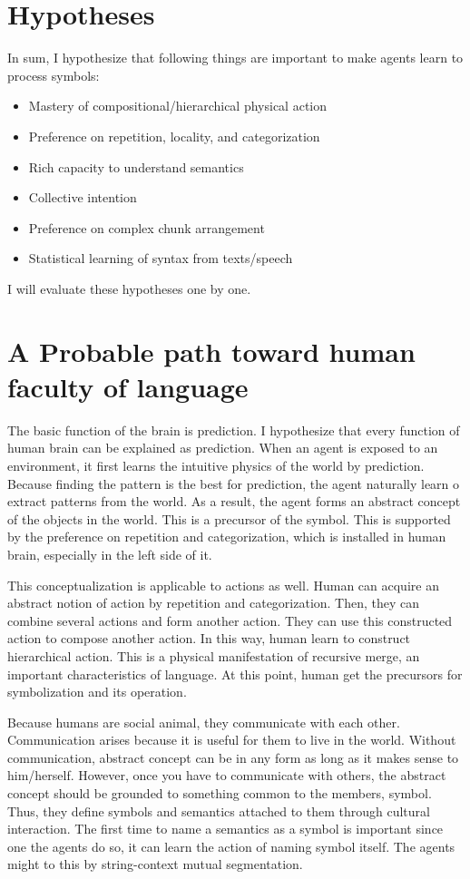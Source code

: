 \documentclass[12pt]{article}
\begin{document}
\section{Hypotheses}
In sum, I hypothesize that following things are important to make agents 
learn to process symbols:
\begin{itemize}
    \item Mastery of compositional/hierarchical physical action
    \item Preference on repetition, locality, and categorization
    \item Rich capacity to understand semantics
    \item Collective intention
    \item Preference on complex chunk arrangement
    \item Statistical learning of syntax from texts/speech
\end{itemize}
I will evaluate these hypotheses one by one.

\section{A Probable path toward human faculty of language}
The basic function of the brain is prediction. I hypothesize that every function 
of human brain can be explained as prediction. When an agent is exposed to 
an environment, it first learns the intuitive physics of the world by prediction. 
Because finding the pattern is the best for prediction, the agent naturally learn o extract 
patterns from the world. As a result, the agent forms an abstract concept of the objects in the world. 
This is a precursor of the symbol. This is supported by the preference on repetition and categorization, 
which is installed in human brain, especially in the left side of it. 

This conceptualization is applicable to actions as well. Human can acquire an abstract 
notion of action by repetition and categorization. Then, they can combine several actions 
and form another action. They can use this constructed action to compose another action. 
In this way, human learn to construct hierarchical action. This is a physical manifestation of 
recursive merge, an important characteristics of language. At this point, 
human get the precursors for symbolization and its operation. 

Because humans are social animal, they communicate with each other. Communication arises because 
it is useful for them to live in the world. Without communication, abstract concept can be in any form 
as long as it makes sense to him/herself. However, once you have to communicate with others, the 
abstract concept should be grounded to something common to the members, symbol. 
Thus, they define symbols and semantics attached to them 
through cultural interaction. The first time to name a semantics as a symbol is important 
since one the agents do so, it can learn the action of naming symbol itself. The agents might to 
this by string-context mutual segmentation. 
\end{document}
